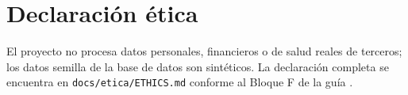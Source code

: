 \documentclass[12pt]{article}
\begin{document}
\section*{Declaración ética}

El proyecto no procesa datos personales, financieros o de salud reales de terceros; los datos
semilla de la base de datos son sintéticos. La declaración completa se encuentra en
\texttt{docs/etica/ETHICS.md} conforme al Bloque F de la guía \cite{uteq2026guia}.

\printbibliography[title={Referencias}]
\end{document}
